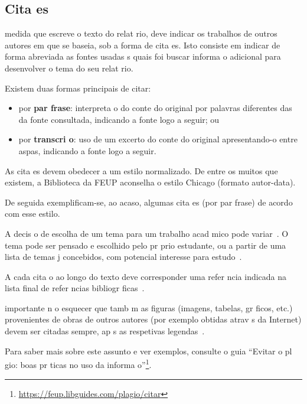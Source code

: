 \documentclass{article}
\begin{document}
\lipsum[6]

\subsection*{Cita es}

  medida que escreve o texto do relat rio, deve indicar os trabalhos
de outros autores em que se baseia, sob a forma de cita es.
Isto consiste em indicar de forma abreviada as fontes usadas  s quais
foi buscar informa o adicional para desenvolver o tema do seu
relat rio.

Existem duas formas principais de citar:
\begin{itemize}
\item por \textbf{par frase}: interpreta o do conte do original por
  palavras diferentes das da fonte consultada, indicando a fonte logo
  a seguir; ou 
\item 
  por \textbf{transcri o}: uso de um excerto do conte do original
  apresentando-o entre aspas, indicando a fonte logo a seguir.
\end{itemize}

As cita es devem obedecer a um estilo normalizado.
De entre os muitos que existem, a Biblioteca da FEUP aconselha o
estilo Chicago (formato autor-data).

\begin{info}
De seguida exemplificam-se, ao acaso, algumas cita es (por par frase)
de acordo com esse estilo.
\end{info}

A decis o de escolha de um tema para um trabalho acad mico pode
variar~\cite{kn:Bel02-book}.
O tema pode ser pensado e escolhido pelo pr prio estudante, ou a
partir de uma lista de temas j  concebidos, com potencial interesse
para estudo~\cite{kn:GLPR14-joPhysics}.

A cada cita o ao longo do texto deve corresponder uma refer ncia
indicada na lista final de refer ncias
bibliogr ficas~\cite{kn:Lip08,kn:MSS+12-wemep,kn:VKL+18-dtu}. 

  importante n o esquecer que tamb m as figuras (imagens, tabelas,
gr ficos, etc.) provenientes de obras de outros autores (por exemplo 
obtidas atrav s da Internet) devem ser citadas sempre, ap s as
respetivas legendas~\cite{kn:GLPC22-torque}.

Para saber mais sobre este assunto e ver exemplos, consulte o guia
``Evitar o pl gio: boas pr ticas no uso da
informa o''\footnote{\url{https://feup.libguides.com/plagio/citar}}.  
\end{document}
